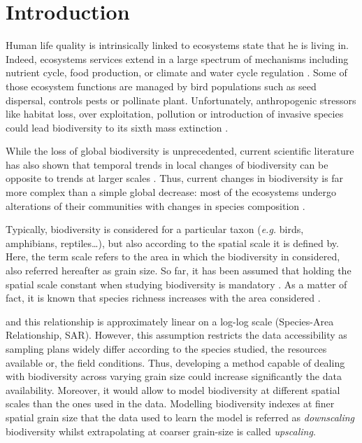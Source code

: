 \documentclass[
  12pt,
  oneside]{report}
\begin{document}
\hypertarget{intro}{%
\chapter{Introduction}\label{intro}}

Human life quality is intrinsically linked to ecosystems state that he is living in. Indeed, ecosystems services extend in a large spectrum of mechanisms including nutrient cycle, food production, or climate and water cycle regulation \autocite{pereira_global_2012}. Some of those ecosystem
functions are managed by bird populations such as seed dispersal, controls pests or pollinate plant.
Unfortunately, anthropogenic stressors like habitat loss, over exploitation, pollution or introduction of
invasive species could lead biodiversity to its sixth mass extinction \autocite{barnosky_has_2011}.

While the loss of global biodiversity is unprecedented, current scientific literature has also shown that
temporal trends in local changes of biodiversity can be opposite to trends at larger scales \autocite{chase_species_2019}. Thus, current changes in biodiversity is far more complex than a simple global decrease:
most of the ecosystems undergo alterations of their communities with changes in species composition \autocite{blowes_geography_2019,dornelas_assemblage_2014}.

Typically, biodiversity is considered for a particular taxon (\emph{e.g.} birds, amphibians, reptiles\ldots), but also
according to the spatial scale it is defined by. Here, the term scale refers to the area in which the
biodiversity in considered, also referred hereafter as grain size. So far, it has been assumed that
holding the spatial scale constant when studying biodiversity is mandatory \autocite{whittaker_scale_2001}. As
a matter of fact, it is known that species richness increases with the area considered \autocite{arrhenius_species_1921}.

and this relationship is approximately linear on a log-log scale (Species-Area Relationship,
SAR). However, this assumption restricts the data accessibility as sampling plans widely differ
according to the species studied, the resources available or, the field conditions. Thus, developing a
method capable of dealing with biodiversity across varying grain size could increase significantly the
data availability. Moreover, it would allow to model biodiversity at different spatial scales than the
ones used in the data. Modelling biodiversity indexes at finer spatial grain size that the data used to
learn the model is referred as \emph{downscaling} biodiversity whilst extrapolating at coarser grain-size is
called \emph{upscaling}.
\end{document}

